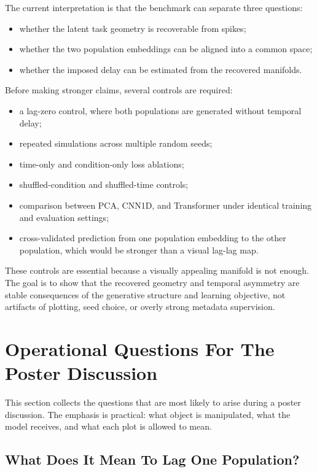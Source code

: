 \documentclass[11pt]{article}
\begin{document}
The current interpretation is that the benchmark can separate three questions:

\begin{itemize}
    \item whether the latent task geometry is recoverable from spikes;
    \item whether the two population embeddings can be aligned into a common
    space;
    \item whether the imposed delay can be estimated from the recovered
    manifolds.
\end{itemize}

Before making stronger claims, several controls are required:

\begin{itemize}
    \item a lag-zero control, where both populations are generated without
    temporal delay;
    \item repeated simulations across multiple random seeds;
    \item time-only and condition-only loss ablations;
    \item shuffled-condition and shuffled-time controls;
    \item comparison between PCA, CNN1D, and Transformer under identical
    training and evaluation settings;
    \item cross-validated prediction from one population embedding to the
    other population, which would be stronger than a visual lag-lag map.
\end{itemize}

These controls are essential because a visually appealing manifold is not
enough. The goal is to show that the recovered geometry and temporal asymmetry
are stable consequences of the generative structure and learning objective,
not artifacts of plotting, seed choice, or overly strong metadata supervision.

\section{Operational Questions For The Poster Discussion}

This section collects the questions that are most likely to arise during a
poster discussion. The emphasis is practical: what object is manipulated, what
the model receives, and what each plot is allowed to mean.

\subsection{What Does It Mean To Lag One Population?}
\end{document}
